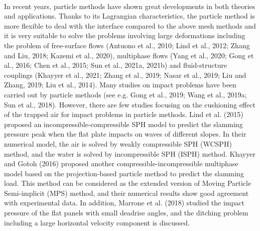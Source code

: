 \documentclass[UTF8]{ctexart}
\begin{document}
\paragraph{\quad}In recent years, particle methods have shown great developments in both theories
                and applications. Thanks to its Lagrangian characteristics, the particle method is 
                more flexible to deal with the interface compared to the above mesh methods and it 
                is very suitable to solve the problems involving large deformations including the 
                problem of free-surface flows (Antuono et al., 2010; Lind et al., 2012; Zhang 
                and Liu, 2018; Kazemi et al., 2020), multiphase flows (Yang et al., 2020; Gong et al., 2016; 
                Chen et al., 2015; Sun et al., 2021a, 2021b) and fluid-structure couplings 
                (Khayyer et al., 2021; Zhang et al., 2019; Nasar et al., 2019; Liu and Zhang, 2019; Liu et al., 2014). 
                Many studies on impact problems have been carried out by particle methods 
                (see e.g. Gong et al., 2019; Wang et al., 2019a; Sun et al., 2018).
                However, there are few studies focusing on the cushioning effect of the trapped 
                air for impact problems in particle methods. Lind et al. (2015) proposed an 
                incompressible-compressible SPH model to predict the slamming pressure peak when the flat plate 
                impacts on waves of different slopes. In their numerical model, the air is solved by weakly 
                compressible SPH (WCSPH) method, and the water is solved by incompressible SPH (ISPH) method. 
                Khayyer and Gotoh (2016) proposed another compressible-incompressible multiphase model based 
                on the projection-based particle method to predict the slamming load. This method can be considered 
                as the extended version of Moving Particle Semi-implicit (MPS) method, and their numerical results 
                show good agreement with experimental data. In addition, Marrone et al. (2018) studied the impact 
                pressure of the flat panels with small deadrise angles, and the ditching problem including 
                a large horizontal velocity component is discussed.
\end{document}
